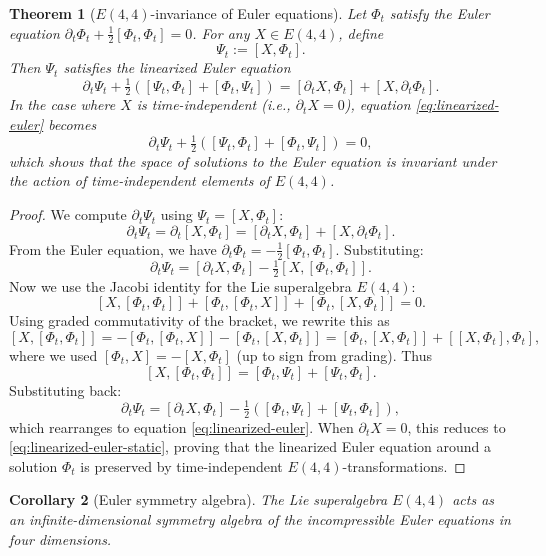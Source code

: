 \documentclass[reqno,10pt]{amsart}
\theoremstyle{plain}
\newtheorem{theorem}{Theorem}[section]
\newtheorem{corollary}[theorem]{Corollary}
\theoremstyle{definition}
\def\gE{E(4,4)}
\begin{document}
\begin{theorem}[$\gE$-invariance of Euler equations]\label{thm:e44-invariance}
Let $\Phi_t$ satisfy the Euler equation $\partial_t\Phi_t + \tfrac{1}{2}[\Phi_t,\Phi_t]=0$. For any $X\in\gE$, define
\[
  \Psi_t := [X,\Phi_t].
\]
Then $\Psi_t$ satisfies the \emph{linearized} Euler equation
\begin{equation}\label{eq:linearized-euler}
  \partial_t\Psi_t + \tfrac{1}{2}([\Psi_t,\Phi_t] + [\Phi_t,\Psi_t]) = [\partial_t X,\Phi_t] + [X,\partial_t\Phi_t].
\end{equation}
In the case where $X$ is time-independent (i.e., $\partial_t X=0$), equation \eqref{eq:linearized-euler} becomes
\begin{equation}\label{eq:linearized-euler-static}
  \partial_t\Psi_t + \tfrac{1}{2}([\Psi_t,\Phi_t] + [\Phi_t,\Psi_t]) = 0,
\end{equation}
which shows that the space of solutions to the Euler equation is invariant under the action of time-independent elements of $\gE$.
\end{theorem}

\begin{proof}
We compute $\partial_t\Psi_t$ using $\Psi_t = [X,\Phi_t]$:
\[
  \partial_t\Psi_t = \partial_t[X,\Phi_t] = [\partial_t X,\Phi_t] + [X,\partial_t\Phi_t].
\]
From the Euler equation, we have $\partial_t\Phi_t = -\tfrac{1}{2}[\Phi_t,\Phi_t]$. Substituting:
\[
  \partial_t\Psi_t = [\partial_t X,\Phi_t] - \tfrac{1}{2}[X,[\Phi_t,\Phi_t]].
\]
Now we use the Jacobi identity for the Lie superalgebra $\gE$:
\[
  [X,[\Phi_t,\Phi_t]] + [\Phi_t,[\Phi_t,X]] + [\Phi_t,[X,\Phi_t]] = 0.
\]
Using graded commutativity of the bracket, we rewrite this as
\[
  [X,[\Phi_t,\Phi_t]] = -[\Phi_t,[\Phi_t,X]] - [\Phi_t,[X,\Phi_t]] = [\Phi_t,[X,\Phi_t]] + [[X,\Phi_t],\Phi_t],
\]
where we used $[\Phi_t,X] = -[X,\Phi_t]$ (up to sign from grading). Thus
\[
  [X,[\Phi_t,\Phi_t]] = [\Phi_t,\Psi_t] + [\Psi_t,\Phi_t].
\]
Substituting back:
\[
  \partial_t\Psi_t = [\partial_t X,\Phi_t] - \tfrac{1}{2}([\Phi_t,\Psi_t] + [\Psi_t,\Phi_t]),
\]
which rearranges to equation \eqref{eq:linearized-euler}. When $\partial_t X=0$, this reduces to \eqref{eq:linearized-euler-static}, proving that the linearized Euler equation around a solution $\Phi_t$ is preserved by time-independent $\gE$-transformations.
\end{proof}

\begin{corollary}[Euler symmetry algebra]
The Lie superalgebra $\gE$ acts as an infinite-dimensional symmetry algebra of the incompressible Euler equations in four dimensions.
\end{corollary}
\end{document}
